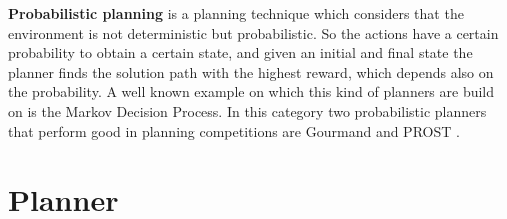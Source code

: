\textbf{Probabilistic planning} is a planning technique which considers that the environment is not deterministic but probabilistic. So the actions have a certain probability to obtain a certain state, and given an initial and final state the planner  finds the solution path with the highest reward, which depends also on the probability. A well known example on which this kind of planners are build on is the Markov Decision Process.
In this category two probabilistic planners that perform good in planning competitions are Gourmand \cite{Gourmand} and PROST \cite{PROST}.

\section{Planner}

